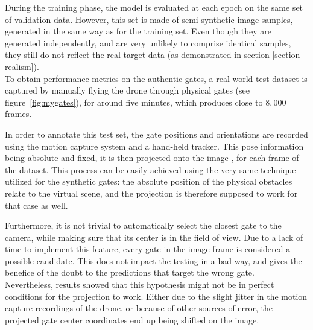 During the training phase, the model is evaluated at each epoch on the same set
of validation data. However, this set is made of semi-synthetic image samples,
generated in the same way as for the training set. Even though they are
generated independently, and are very unlikely to comprise identical samples,
they still do not reflect the real target data (as demonstrated in section
\ref{section-realism}).\\


To obtain performance metrics on the authentic gates, a real-world test dataset
is captured by manually flying the drone through physical gates (see
figure~\ref{fig:mygates}), for around five minutes, which produces close to
$8,000$ frames.

In order to annotate this test set, the gate positions and orientations are
recorded using the motion capture system and a hand-held tracker. This pose
information being absolute and fixed, it is then projected onto the image
, for each frame of the dataset. This process can be easily achieved using the
very same technique utilized for the synthetic gates: the absolute position of
the physical obstacles relate to the virtual scene, and the projection is
therefore supposed to work for that case as well.

Furthermore, it is not trivial to automatically select the closest gate to the
camera, while making sure that its center is in the field of view. Due to a
lack of time to implement this feature, every gate in the image frame is
considered a possible candidate. This does not impact the testing in a bad way,
and gives the benefice of the doubt to the predictions that target the wrong
gate.\\

Nevertheless, results showed that this hypothesis might not be in perfect
conditions for the projection to work. Either due to the slight jitter in the
motion capture recordings of the drone, or because of other sources of error,
the projected gate center coordinates end up being shifted on the image.

